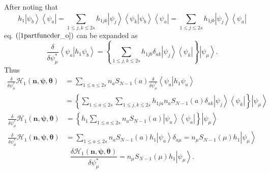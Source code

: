 \documentclass[aps,preprint]{revtex4}%
\begin{document}
After noting that
\begin{equation}
h_{1}\left\vert \psi_{b}\right\rangle \left\langle \psi_{a}\right\vert
=\sum_{1\leq j,k\leq2s}h_{1jk}\left\vert \psi_{j}\right\rangle \left\langle
\left.  \psi_{k}\right\vert \psi_{b}\right\rangle \left\langle \psi
_{a}\right\vert =\sum_{1\leq j\leq2s}h_{1jb}\left\vert \psi_{j}\right\rangle
\left\langle \psi_{a}\right\vert
\end{equation}
eq. $\left(  \ref{1partfuncder_o}\right)  $ can be expanded as
\begin{equation}
\frac{\delta}{\delta\psi_{\mu}^{\ast}}\left\langle \left.  \psi_{a}\right\vert
h_{1}\psi_{b}\right\rangle =\left\{  \sum_{1\leq j,k\leq2s}h_{1jb}\delta
_{ak}\left\vert \psi_{j}\right\rangle \left\langle \psi_{k}\right\vert
\right\}  \left\vert \psi_{\mu}\right\rangle . \label{1partfuncder_ex}%
\end{equation}
Thus
\begin{align}
\frac{\delta}{\delta\psi_{\mu}^{\ast}}\mathcal{H}_{1}\left(  \mathbf{n}%
,\mathbf{\psi},\mathbf{\theta}\right)   &  =\sum_{1\leq a\leq2s}n_{a}%
S_{N-1}\left(  a\right)  \frac{\delta}{\delta\psi_{\mu}^{\ast}}\left\langle
\left.  \psi_{a}\right\vert h_{1}\psi_{a}\right\rangle \\
&  =\left\{  \sum_{1\leq a\leq2s}\sum_{1\leq j,k\leq2s}h_{1ja}n_{a}%
S_{N-1}\left(  a\right)  \delta_{ak}\left\vert \psi_{j}\right\rangle
\left\langle \psi_{k}\right\vert \right\}  \left\vert \psi_{\mu}\right\rangle
\end{align}%
\begin{align}
\frac{\delta}{\delta\psi_{\mu}^{\ast}}\mathcal{H}_{1}\left(  \mathbf{n}%
,\mathbf{\psi},\mathbf{\theta}\right)   &  =\left\{  h_{1}\sum_{1\leq a\leq
2s}n_{a}S_{N-1}\left(  a\right)  \left\vert \psi_{a}\right\rangle \left\langle
\psi_{a}\right\vert \right\}  \left\vert \psi_{\mu}\right\rangle \\
\frac{\delta}{\delta\psi_{\mu}^{\ast}}\mathcal{H}_{1}\left(  \mathbf{n}%
,\mathbf{\psi},\mathbf{\theta}\right)   &  =\sum_{1\leq a\leq2s}n_{a}%
S_{N-1}\left(  a\right)  h_{1}\left\vert \psi_{a}\right\rangle \delta_{a\mu
}=n_{\mu}S_{N-1}\left(  \mu\right)  h_{1}\left\vert \psi_{\mu}\right\rangle
\end{align}%
\begin{equation}
\frac{\delta\mathcal{H}_{1}\left(  \mathbf{n},\mathbf{\psi},\mathbf{\theta
}\right)  }{\delta\psi_{\mu}^{\ast}}=n_{\mu}S_{N-1}\left(  \mu\right)
h_{1}\left\vert \psi_{\mu}\right\rangle .
\end{equation}
\end{document}
